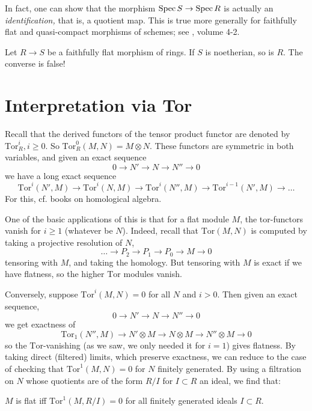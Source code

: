 In fact, one can show that the morphism $\operatorname{Spec} S \to \operatorname{Spec} R$ is actually an
\emph{identification,} that is, a quotient map. This is true more generally
for faithfully flat and quasi-compact morphisms of schemes; see \cite{EGA},
volume 4-2.

\begin{exercise} 
Let $R \to S$ be a faithfully flat morphism of rings. If $S$ is noetherian, so
is $R$. The converse is false!
\end{exercise} 




\section{Interpretation via Tor}

Recall that the derived functors of the tensor product functor are denoted by $\mathrm{Tor} _R^i, i \geq 0$.  So $\mathrm{Tor} _R^0(M,N) = M \otimes N$.  These functors are symmetric in both variables, and  given an exact sequence
\[ 0 \to N' \to N \to N'' \to 0 \]
we have a long exact sequence
\[ \mathrm{Tor} ^i(N',M) \to \mathrm{Tor} ^i(N,M) \to \mathrm{Tor} ^i(N'',M ) \to \mathrm{Tor} ^{i-1}(N',M) \to \dots \]
For this, cf. books on homological algebra.

One of the basic applications of this is that for a flat module $M$, the tor-functors vanish for $i \geq 1$ (whatever be $N$).
Indeed, recall that $\mathrm{Tor} (M,N)$ is computed by taking a projective resolution of $N$,
\[ \dots \to P_2 \to P_1 \to P_0 \to M \to 0 \]
tensoring with $M$, and taking the homology.  But tensoring with $M$ is exact if we have flatness, so the higher $\mathrm{Tor} $ modules vanish.

Conversely, suppose $\mathrm{Tor} ^i(M,N) = 0$ for all $N$ and $i>0$.  Then given an exact sequence,
\[ 0 \to N'   \to N \to N'' \to 0 \]
we get exactness of
\[  \mathrm{Tor} _1(N'',M)  \to N' \otimes M \to N \otimes M \to N'' \otimes M \to 0 \]
so the $\mathrm{Tor} $-vanishing (as we saw, we only needed it for $i=1$) gives flatness.
By taking direct (filtered) limits, which preserve exactness, we can reduce to the case of checking that $\mathrm{Tor} ^1(M,N) = 0$ for $N$ finitely generated.  By using a filtration on $N$ whose quotients are of the form $R/I$ for $I \subset R$ an ideal, we find that:

\begin{proposition} $M$ is flat iff $\mathrm{Tor} ^1(M,R/I)=0$ for all finitely generated ideals $I \subset R$.
\end{proposition}

